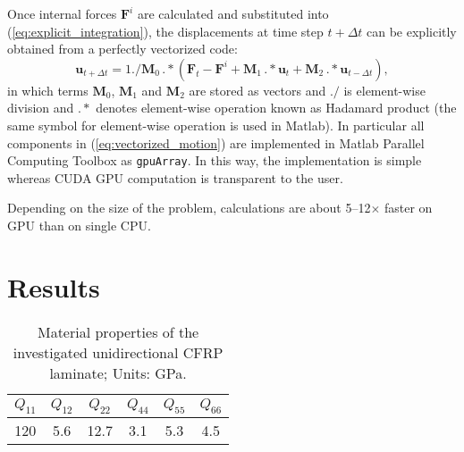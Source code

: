 \documentclass[runningheads]{llncs}
\renewcommand{\vec}[1]{\mathbf{#1}}
\begin{document}
Once internal forces \(\vec{F}^i\) are calculated and substituted into (\ref{eq:explicit_integration}), the displacements at time step \(t+\Delta t\) can be explicitly obtained from a perfectly vectorized code:
\begin{equation}
\vec{u}_{t+\Delta t}=1./\vec{M}_0\, .*\left(\vec{F}_t - \vec{F}^i +\vec{M}_1 \, .* \vec{u}_t +\vec{M}_2 \, .* \vec{u}_{t-\Delta t}\right),
\label{eq:vectorized_motion}
\end{equation} 
in which terms \(\vec{M}_0\), \(\vec{M}_1\) and \(\vec{M}_2\) are stored as vectors and \(./\) is element-wise division  and \(.*\) denotes element-wise operation known as Hadamard product (the same symbol for element-wise operation is used in Matlab). 
In particular all components in (\ref{eq:vectorized_motion}) are implemented in Matlab Parallel Computing Toolbox as \verb|gpuArray|. 
In this way, the implementation is simple whereas CUDA GPU computation is transparent to the user. 

Depending on the size of the problem,  calculations are  about 5--12\(\times\) faster on GPU than on single CPU.
\clearpage
\section{Results}
\begin{table}[h!]
		\renewcommand{\arraystretch}{1.3}
	\caption{Material properties of the investigated unidirectional CFRP laminate; Units: GPa.}
	\begin{center}
			\begin{tabular}{cccccc} 
			\toprule
			$Q_{11}$ & $Q_{12}$  & $Q_{22}$ & $Q_{44}$ & $Q_{55}$ & $Q_{66}$\\
			\midrule
			120& 5.6& 12.7 & 3.1 & 5.3 & 4.5\\
			\bottomrule 
		\end{tabular} 
	\end{center}
		\label{tab:mat_prop}

\end{table}
\end{document}

